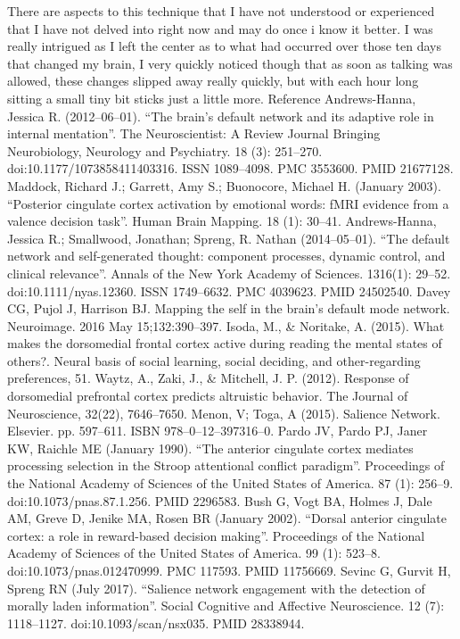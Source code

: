 \documentclass{article}
\begin{document}
There are aspects to this technique that I have not understood or experienced that I have not delved into right now and may do once i know it better.
I was really intrigued as I left the center as to what had occurred over those ten days that changed my brain, I very quickly noticed though that as soon as talking was allowed, these changes slipped away really quickly, but with each hour long sitting a small tiny bit sticks just a little more.
Reference
Andrews-Hanna, Jessica R. (2012–06–01). “The brain’s default network and its adaptive role in internal mentation”. The Neuroscientist: A Review Journal Bringing Neurobiology, Neurology and Psychiatry. 18 (3): 251–270. doi:10.1177/1073858411403316. ISSN 1089–4098. PMC 3553600. PMID 21677128.
Maddock, Richard J.; Garrett, Amy S.; Buonocore, Michael H. (January 2003). “Posterior cingulate cortex activation by emotional words: fMRI evidence from a valence decision task”. Human Brain Mapping. 18 (1): 30–41.
Andrews-Hanna, Jessica R.; Smallwood, Jonathan; Spreng, R. Nathan (2014–05–01). “The default network and self-generated thought: component processes, dynamic control, and clinical relevance”. Annals of the New York Academy of Sciences. 1316(1): 29–52. doi:10.1111/nyas.12360. ISSN 1749–6632. PMC 4039623. PMID 24502540.
Davey CG, Pujol J, Harrison BJ. Mapping the self in the brain’s default mode network. Neuroimage. 2016 May 15;132:390–397.
Isoda, M., \& Noritake, A. (2015). What makes the dorsomedial frontal cortex active during reading the mental states of others?. Neural basis of social learning, social deciding, and other-regarding preferences, 51.
Waytz, A., Zaki, J., \& Mitchell, J. P. (2012). Response of dorsomedial prefrontal cortex predicts altruistic behavior. The Journal of Neuroscience, 32(22), 7646–7650.
Menon, V; Toga, A (2015). Salience Network. Elsevier. pp. 597–611. ISBN 978–0–12–397316–0.
Pardo JV, Pardo PJ, Janer KW, Raichle ME (January 1990). “The anterior cingulate cortex mediates processing selection in the Stroop attentional conflict paradigm”. Proceedings of the National Academy of Sciences of the United States of America. 87 (1): 256–9. doi:10.1073/pnas.87.1.256. PMID 2296583.
Bush G, Vogt BA, Holmes J, Dale AM, Greve D, Jenike MA, Rosen BR (January 2002). “Dorsal anterior cingulate cortex: a role in reward-based decision making”. Proceedings of the National Academy of Sciences of the United States of America. 99 (1): 523–8. doi:10.1073/pnas.012470999. PMC 117593. PMID 11756669.
Sevinc G, Gurvit H, Spreng RN (July 2017). “Salience network engagement with the detection of morally laden information”. Social Cognitive and Affective Neuroscience. 12 (7): 1118–1127. doi:10.1093/scan/nsx035. PMID 28338944.
\end{document}
